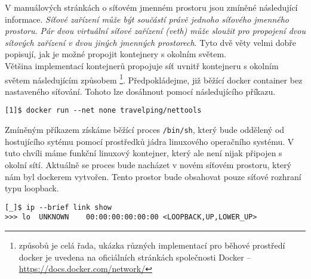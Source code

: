 V manuálových stránkách o síťovém jmenném prostoru jsou zmíněné následující informace. \emph{Síťové zařízení může být součástí právě jednoho síťového jmenného prostoru.} \emph{Pár dvou virtuální síťové zařízení (veth) může sloužit pro propojení dvou sítových zařízení v dvou jiných jmenných prostorech}.\cite{a2022_network_namespaces7} Tyto dvě věty velmi dobře popisují, jak je možné propojit kontejnery s okolním světem.\\
Většina implementací kontejnerů propojuje síť uvnitř kontejneru s okolním světem následujícím způsobem \footnote{způsobů je celá řada, ukázka různých implementací pro běhové prostředí docker je uvedena na oficiálních stránkách společnosti Docker -- \url{https://docs.docker.com/network/}}. Předpokládejme, již běžící docker container bez nastaveného síťování. Tohoto lze dosáhnout pomocí následujícího příkazu.
\begin{verbatim}
[1]$ docker run --net none travelping/nettools
\end{verbatim}
Zmíněným příkazem získáme běžící proces \verb|/bin/sh|, který bude oddělený od hostujícího sytému pomocí prostředků jádra linuxového operačního systému. V tuto chvíli máme funkční linuxový kontejner, který ale není nijak připojen s okolní sítí. Aktuálně se proces bude nacházet v novém síťovém prostoru, který nám byl dockerem vytvořen. Tento prostor bude obsahovat pouze síťové rozhraní typu loopback. 

\begin{verbatim}
[_]$ ip --brief link show
>>> lo  UNKNOWN    00:00:00:00:00:00 <LOOPBACK,UP,LOWER_UP>
\end{verbatim}

